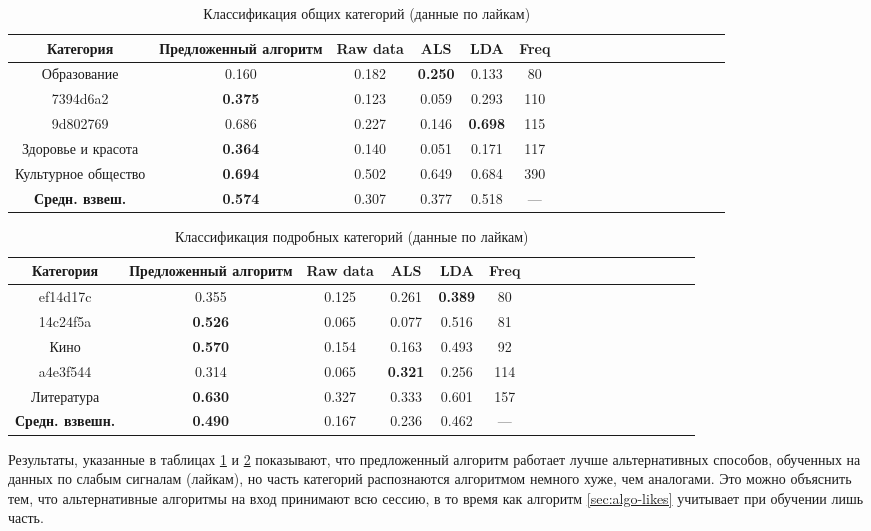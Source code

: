 \documentclass[times,specification,annotation]{itmo-student-thesis}
\begin{document}
\begin{table}[!h]
\caption{Классификация общих категорий (данные по лайкам)}\label{tab-likes-g}
\centering
\begin{tabular}{|*{18}{c|}}\hline
Категория & Предложенный алгоритм  & Raw data & ALS & LDA & Freq \\\hline
Образование                          & 0.160 & 0.182 &  \textbf{0.250} & 0.133 & 80 \\\hline
7394d6a2                          &  \textbf{0.375} & 0.123 & 0.059 & 0.293 & 110 \\\hline
9d802769                          & 0.686 & 0.227 & 0.146 &  \textbf{0.698} & 115 \\\hline
Здоровье и красота       &  \textbf{0.364} & 0.140 & 0.051 & 0.171 & 117  \\\hline
Культурное общество   &  \textbf{0.694} & 0.502 & 0.649 & 0.684 & 390 \\\hline
\textbf{Средн. взвеш.}                  &  \textbf{0.574} & 0.307 & 0.377 & 0.518 & --- \\\hline
\end{tabular}
\end{table}

\begin{table}[!h]
\caption{Классификация подробных категорий (данные по лайкам)}\label{tab-likes-d}
\centering
\begin{tabular}{|*{18}{c|}}\hline
Категория & Предложенный алгоритм  & Raw data & ALS & LDA & Freq \\\hline
ef14d17c             &  0.355 & 0.125 & 0.261 & \textbf{0.389} & 80 \\\hline
14c24f5a             & \textbf{0.526} & 0.065 & 0.077 &  0.516 & 81 \\\hline
Кино            &  \textbf{0.570} & 0.154 & 0.163 & 0.493 & 92 \\\hline
a4e3f544             & 0.314 & 0.065 & \textbf{0.321} &  0.256 & 114  \\\hline
Литература            & \textbf{0.630} & 0.327 & 0.333 &  0.601 & 157 \\\hline
\textbf{Средн. взвешн.}  &  \textbf{0.490} & 0.167 & 0.236 & 0.462 & --- \\\hline
\end{tabular}
\end{table}

Результаты, указанные в таблицах \ref{tab-likes-g} и \ref{tab-likes-d} показывают, что предложенный алгоритм работает лучше альтернативных способов, обученных на данных по слабым сигналам (лайкам), но часть категорий распознаются алгоритмом немного хуже, чем аналогами. Это можно объяснить тем, что альтернативные алгоритмы на вход принимают всю сессию, в то время как алгоритм \ref{sec:algo-likes} учитывает при обучении лишь часть. 
\end{document}
